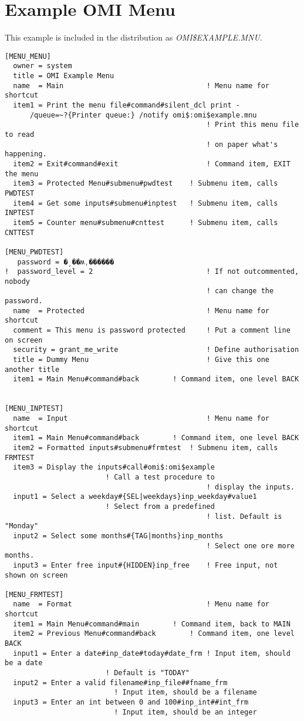\documentclass[a4paper]{book}
\begin{document}
\appendix
\chapter{Example OMI Menu}

This example is included in the distribution as \textsl{OMI{\$}EXAMPLE.MNU}.

\begin{verbatim}
[MENU_MENU]
  owner = system
  title = OMI Example Menu
  name  = Main                                  ! Menu name for shortcut
  item1 = Print the menu file#command#silent_dcl print -
	  /queue=~?{Printer queue:} /notify omi$:omi$example.mnu
                                                ! Print this menu file to read
                                                ! on paper what's happening.
  item2 = Exit#command#exit                     ! Command item, EXIT the menu
  item3 = Protected Menu#submenu#pwdtest	! Submenu item, calls PWDTEST
  item4 = Get some inputs#submenu#inptest	! Submenu item, calls INPTEST
  item5 = Counter menu#submenu#cnttest		! Submenu item, calls CNTTEST

[MENU_PWDTEST]
   password = �ˏ��ʍˌ������
!  password_level = 2                           ! If not outcommented, nobody
                                                ! can change the password.
  name  = Protected                             ! Menu name for shortcut
  comment = This menu is password protected     ! Put a comment line on screen
  security = grant_me_write                     ! Define authorisation
  title = Dummy Menu                            ! Give this one another title
  item1 = Main Menu#command#back		! Command item, one level BACK


[MENU_INPTEST]
  name  = Input                                 ! Menu name for shortcut
  item1 = Main Menu#command#back		! Command item, one level BACK
  item2 = Formatted inputs#submenu#frmtest	! Submenu item, calls FRMTEST
  item3 = Display the inputs#call#omi$:omi$example
						! Call a test procedure to
                                                ! display the inputs.
  input1 = Select a weekday#{SEL|weekdays}inp_weekday#value1
						! Select from a predefined
                                                ! list. Default is "Monday"
  input2 = Select some months#{TAG|months}inp_months
                                                ! Select one ore more months.
  input3 = Enter free input#{HIDDEN}inp_free    ! Free input, not shown on screen

[MENU_FRMTEST]
  name  = Format                                ! Menu name for shortcut
  item1 = Main Menu#command#main		! Command item, back to MAIN
  item2 = Previous Menu#command#back		! Command item, one level BACK
  input1 = Enter a date#inp_date#today#date_frm ! Input item, should be a date
						! Default is "TODAY"
  input2 = Enter a valid filename#inp_file##fname_frm
					      ! Input item, should be a filename
  input3 = Enter an int between 0 and 100#inp_int##int_frm
					      ! Input item, should be an integer


\end{verbatim}
\end{document}
